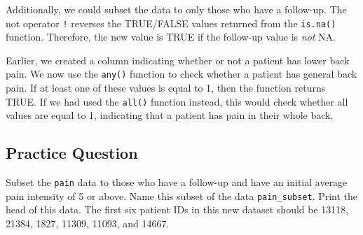 \documentclass[
  letterpaper,
]{latex/krantz}
\makeatletter
\newenvironment{Shaded}{\begin{snugshade}}{\end{snugshade}}
\newcommand{\DecValTok}[1]{\textcolor[rgb]{0.68,0.00,0.00}{#1}}
\newcommand{\FunctionTok}[1]{\textcolor[rgb]{0.28,0.35,0.67}{#1}}
\newcommand{\NormalTok}[1]{\textcolor[rgb]{0.00,0.23,0.31}{#1}}
\newcommand{\OtherTok}[1]{\textcolor[rgb]{0.00,0.23,0.31}{#1}}
\newcommand{\SpecialCharTok}[1]{\textcolor[rgb]{0.37,0.37,0.37}{#1}}
\newenvironment{kframe}{%
\medskip{}
\setlength{\fboxsep}{.8em}
 \def\at@end@of@kframe{}%
 \ifinner\ifhmode%
  \def\at@end@of@kframe{\end{minipage}}%
  \begin{minipage}{\columnwidth}%
 \fi\fi%
 \def\FrameCommand##1{\hskip\@totalleftmargin \hskip-\fboxsep
 \colorbox{shadecolor}{##1}\hskip-\fboxsep
     \hskip-\linewidth \hskip-\@totalleftmargin \hskip\columnwidth}%
 \MakeFramed {\advance\hsize-\width
   \@totalleftmargin\z@ \linewidth\hsize
   \@setminipage}}%
 {\par\unskip\endMakeFramed%
 \at@end@of@kframe}
\renewenvironment{Shaded}{\begin{kframe}}{\end{kframe}}
\makeatother
\begin{document}
Additionally, we could subset the data to only those who have a
follow-up. The not operator \texttt{!} reverses the TRUE/FALSE values
returned from the \texttt{is.na()} function. Therefore, the new value is
TRUE if the follow-up value is \emph{not} NA.

\begin{Shaded}
\end{Shaded}

Earlier, we created a column indicating whether or not a patient has
lower back pain. We now use the \texttt{any()} function to check whether
a patient has general back pain. If at least one of these values is
equal to 1, then the function returns TRUE. If we had used the
\texttt{all()} function instead, this would check whether all values are
equal to 1, indicating that a patient has pain in their whole back.

\begin{Shaded}
\end{Shaded}

\subsection{Practice Question}\label{practice-question-5}

Subset the \texttt{pain} data to those who have a follow-up and have an
initial average pain intensity of 5 or above. Name this subset of the
data \texttt{pain\_subset}. Print the head of this data. The first six
patient IDs in this new dataset should be 13118, 21384, 1827, 11309,
11093, and 14667.
\end{document}
